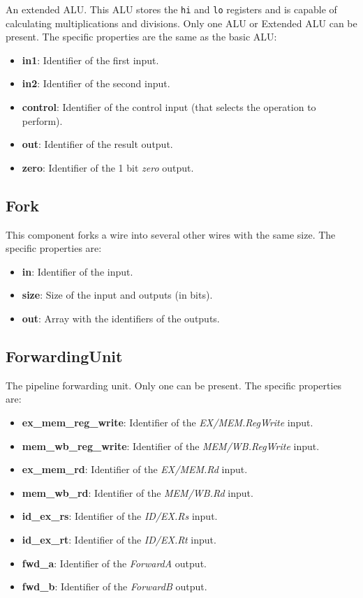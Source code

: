 \documentclass[11pt,a4paper,twoside,titlepage]{report}
\begin{document}
An extended ALU. This ALU stores the \verb+hi+ and \verb+lo+ registers and is
capable of calculating multiplications and divisions.
Only one ALU or Extended ALU can be present. The specific properties are the same
as the basic ALU:
\begin{itemize}
	\item \textbf{in1}: Identifier of the first input.
	\item \textbf{in2}: Identifier of the second input.
	\item \textbf{control}: Identifier of the control input (that selects the operation
		to perform).
	\item \textbf{out}: Identifier of the result output.
	\item \textbf{zero}: Identifier of the 1 bit \emph{zero} output.
\end{itemize}

\subsection{Fork}

This component forks a wire into several other wires with the same size.
The specific properties are:
\begin{itemize}
	\item \textbf{in}: Identifier of the input.
	\item \textbf{size}: Size of the input and outputs (in bits).
	\item \textbf{out}: Array with the identifiers of the outputs.
\end{itemize}

\subsection{ForwardingUnit}

The pipeline forwarding unit. Only one can be present.
The specific properties are:
\begin{itemize}
	\item \textbf{ex\_mem\_reg\_write}: Identifier of the \emph{EX/MEM.RegWrite} input.
	\item \textbf{mem\_wb\_reg\_write}: Identifier of the \emph{MEM/WB.RegWrite} input.
	\item \textbf{ex\_mem\_rd}: Identifier of the \emph{EX/MEM.Rd} input.
	\item \textbf{mem\_wb\_rd}: Identifier of the \emph{MEM/WB.Rd} input.
	\item \textbf{id\_ex\_rs}: Identifier of the \emph{ID/EX.Rs} input.
	\item \textbf{id\_ex\_rt}: Identifier of the \emph{ID/EX.Rt} input.
	\item \textbf{fwd\_a}: Identifier of the \emph{ForwardA} output.
	\item \textbf{fwd\_b}: Identifier of the \emph{ForwardB} output.
\end{itemize}
\end{document}
